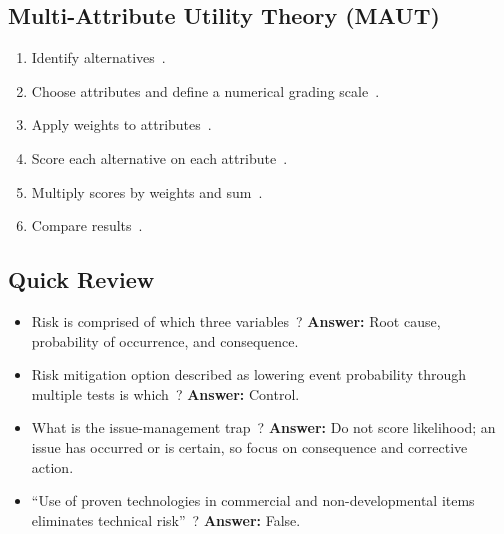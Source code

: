 \documentclass[../main.tex]{subfiles}
\begin{document}
\subsection{Multi-Attribute Utility Theory (MAUT)}
\begin{enumerate}
  \item Identify alternatives~\autocite{edo-3-3-6-risk-management-problem-solving-2025}.
  \item Choose attributes and define a numerical grading scale~\autocite{edo-3-3-6-risk-management-problem-solving-2025}.
  \item Apply weights to attributes~\autocite{edo-3-3-6-risk-management-problem-solving-2025}.
  \item Score each alternative on each attribute~\autocite{edo-3-3-6-risk-management-problem-solving-2025}.
  \item Multiply scores by weights and sum~\autocite{edo-3-3-6-risk-management-problem-solving-2025}.
  \item Compare results~\autocite{edo-3-3-6-risk-management-problem-solving-2025}.
\end{enumerate}

\subsection{Quick Review}
\begin{itemize}
  \item Risk is comprised of which three variables~\autocite{edo-3-3-6-risk-management-problem-solving-2025}? \textbf{Answer:} Root cause, probability of occurrence, and consequence.
  \item Risk mitigation option described as lowering event probability through multiple tests is which~\autocite{edo-3-3-6-risk-management-problem-solving-2025}? \textbf{Answer:} Control.
  \item What is the issue-management trap~\autocite{DoD-RIO-Guide-2017}? \textbf{Answer:} Do not score likelihood; an issue has occurred or is certain, so focus on consequence and corrective action.
  \item ``Use of proven technologies in commercial and non-developmental items eliminates technical risk''~\autocite{edo-3-3-6-risk-management-problem-solving-2025}? \textbf{Answer:} False.
\end{itemize}

\end{document}
